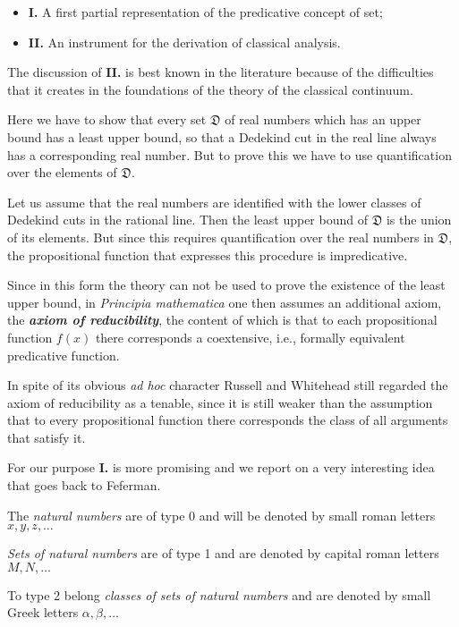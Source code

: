 \documentclass[12pt]{article}
\begin{document}
\begin{itemize}
\item \textbf{I.} A first partial representation of the predicative concept of set;

\item \textbf{II.} An instrument for the derivation of classical analysis.
\end{itemize}

The discussion of \textbf{II.} is best known in the literature because of the difficulties that it creates in the foundations of the theory of the classical continuum.

Here we have to show that every set $\mathfrak{D}$ of real numbers which has an upper bound has a least upper bound, so that a Dedekind cut in the real line always has a corresponding real number. But to prove this we have to use quantification over the elements of $\mathfrak{D}$.

Let us assume that the real numbers are identified with the lower classes of Dedekind cuts in the rational line. Then the least upper bound of $\mathfrak{D}$ is the union of its elements. But since this requires quantification over the real numbers in $\mathfrak{D}$, the propositional function that expresses this procedure is impredicative.

Since in this form the theory can not be used to prove the existence of the least upper bound, in \emph{Principia mathematica} one then assumes an additional axiom, the \textbf{\emph{axiom of reducibility}}, the content of which is that to each propositional function $f (x)$ there corresponds a coextensive, i.e., formally equivalent predicative function. 

In spite of its obvious \emph{ad hoc} character Russell and Whitehead still regarded the axiom of reducibility as a tenable, since it is still weaker than the assumption that to every propositional function there corresponds the class of all arguments that satisfy it. 

For our purpose \textbf{I.} is more promising and we report on a very interesting idea that goes back to Feferman. 

The \emph{natural numbers} are of type 0 and will be denoted by small roman letters $x, y, z, \ldots$

\emph{Sets of natural numbers} are of type 1 and are denoted by capital roman letters $M, N, \ldots$

To type 2 belong \emph{classes of sets of natural numbers} and are denoted by small Greek letters $\alpha, \beta, \ldots$
\end{document}

